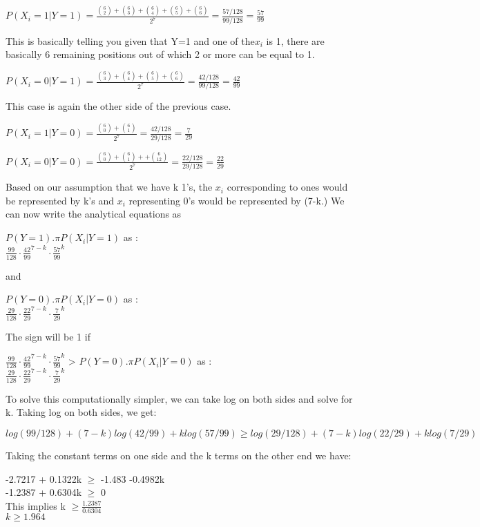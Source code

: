 \documentclass[11pt]{article}
\begin{document}
\begin{itemize}
$P(X_i =1 | Y=1) = \frac{\binom{6}{2} + \binom{6}{3} + \binom{6}{4} + \binom{6}{5} + \binom{6}{6} } { 2^7} = \frac{57/128}{99/128} = \frac{57}{99}$ 

This is basically telling you given that Y=1 and one of the$x_i$ is 1, there are basically 6 remaining positions out of which 2 or more can be equal to 1.

$P(X_i =0 | Y=1) = \frac{\binom{6}{3} + \binom{6}{4} + \binom{6}{5} + \binom{6}{6} } { 2^7} = \frac{42/128}{99/128} = \frac{42}{99}$ 

This case is again the other side of the previous case.

$P(X_i =1 | Y=0) = \frac{\binom{6}{0} + \binom{6}{1}  } { 2^7} = \frac{42/128}{29/128} = \frac{7}{29}$ 

$P(X_i =0 | Y=0) = \frac{\binom{6}{0} + \binom{6}{1} + + \binom{6}{12} } { 2^7} = \frac{22/128}{29/128} = \frac{22}{29}$ 

Based on our assumption that we have k 1's, the $x_i$ corresponding to ones would be represented by k's and $x_i$ representing 0's would be represented by (7-k.) We can now write the analytical equations as 

$ P(Y=1) .\pi P(X_i | Y=1) $ as :\\
$\frac{99}{128} \cdot  \frac{42}{99}^{7-k} \cdot  \frac{57}{99}^{k}$

and 

$ P(Y=0) .\pi P(X_i | Y=0) $ as :\\
$\frac{29}{128} \cdot  \frac{22}{29}^{7-k} \cdot  \frac{7}{29}^{k}$

The sign will be 1 if 

$\frac{99}{128} \cdot  \frac{42}{99}^{7-k} \cdot  \frac{57}{99}^{k}$ >  $ P(Y=0) .\pi P(X_i | Y=0) $ as :\\
$\frac{29}{128} \cdot  \frac{22}{29}^{7-k} \cdot  \frac{7}{29}^{k}$

To solve this computationally simpler, we can take log on both sides and solve for k. Taking log on both sides, we get:

$log(99/128)  + (7-k) log(42/99) +k log(57/99) \geq log(29/128) + (7-k) log (22/29) + k log(7/29)$

Taking the constant terms on one side and the k terms on the other end we have:

-2.7217 + 0.1322k $\geq$ -1.483 -0.4982k \\
-1.2387 + 0.6304k $\geq$ 0\\

This implies k $\geq \frac{1.2387}{0.6304} $\\
$\boxed{k \geq1.964}$



\end{itemize}
\end{document}
